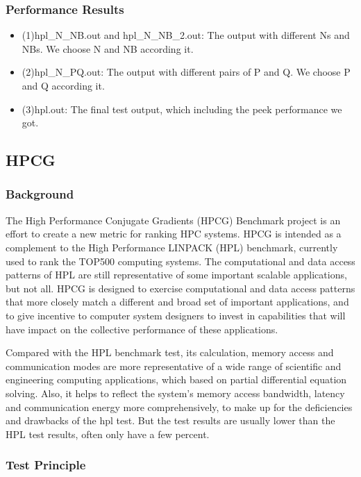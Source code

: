 \documentclass[a4paper,12pt]{article}
\begin{document}
\subsubsection{Performance Results}
\begin{itemize}
    \item (1)hpl\_N\_NB.out and hpl\_N\_NB\_2.out: The output with different Ns and NBs. We choose N and NB according it.
    \item (2)hpl\_N\_PQ.out: The output with different pairs of P and Q. We choose P and Q according it.
    \item (3)hpl.out: The final test output, which including the peek performance we got.
\end{itemize}

\subsection{HPCG}

\subsubsection{Background}

The High Performance Conjugate Gradients (HPCG) Benchmark project is an effort to create a new metric for ranking HPC systems. HPCG is intended as a complement to the High Performance LINPACK (HPL) benchmark, currently used to rank the TOP500 computing systems. The computational and data access patterns of HPL are still representative of some important scalable applications, but not all. HPCG is designed to exercise computational and data access patterns that more closely match a different and broad set of important applications, and to give incentive to computer system designers to invest in capabilities that will have impact on the collective performance of these applications.

Compared with the HPL benchmark test, its calculation, memory access and communication modes are more representative of a wide range of scientific and engineering computing applications, which based on partial differential equation solving. Also, it helps to reflect the system's memory access bandwidth, latency and communication energy more comprehensively, to make up for the deficiencies and drawbacks of the hpl test. But the test results are usually lower than the HPL test results, often only have a few percent.

\subsubsection{Test Principle}
\end{document}
